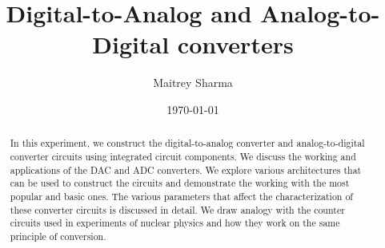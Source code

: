 \documentclass[%
 reprint,
nofootinbib,
 amsmath,amssymb,
 aps,
floatfix,
]{revtex4-2}
\begin{document}

\title{Digital-to-Analog and Analog-to-Digital converters}%


\author{Maitrey Sharma}




\date{\today}%

\begin{abstract}
    In this experiment, we construct the digital-to-analog converter and analog-to-digital converter circuits using integrated circuit components. We discuss the working and applications of the DAC and ADC converters. We explore various architectures that can be used to construct the circuits and demonstrate the working with the most popular and basic ones. The various parameters that affect the characterization of these converter circuits is discussed in detail. We draw analogy with the counter circuits used in experiments of nuclear physics and how they work on the same principle of conversion.
\end{abstract}

\keywords{}
\maketitle

\end{document}
